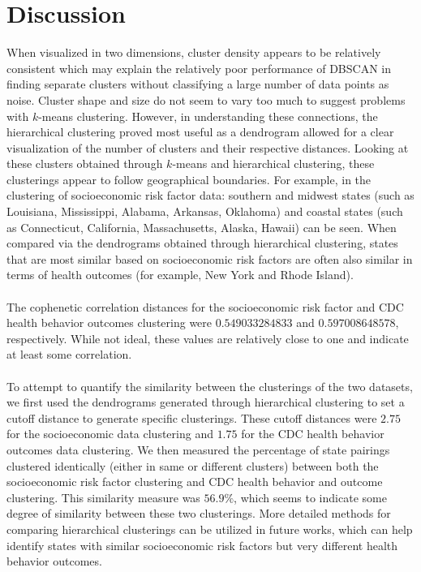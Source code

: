 \documentclass{article}
\begin{document}
\section{Discussion}
\label{Discussion}
When visualized in two dimensions, cluster density appears to be relatively consistent which may explain the relatively poor performance of DBSCAN in finding separate clusters without classifying a large number of data points as noise. Cluster shape and size do not seem to vary too much to suggest problems with $k$-means clustering. However, in understanding these connections, the hierarchical clustering proved most useful as a dendrogram allowed for a clear visualization of the number of clusters and their respective distances. Looking at these clusters obtained through $k$-means and hierarchical clustering, these clusterings appear to follow geographical boundaries. For example, in the clustering of socioeconomic risk factor data: southern and midwest states (such as Louisiana, Mississippi, Alabama, Arkansas, Oklahoma) and coastal states (such as Connecticut, California, Massachusetts, Alaska, Hawaii) can be seen. When compared via the dendrograms obtained through hierarchical clustering, states that are most similar based on socioeconomic risk factors are often also similar in terms of health outcomes (for example, New York and Rhode Island). 
\\\\
The cophenetic correlation distances for the socioeconomic risk factor and CDC health behavior outcomes clustering were $0.549033284833$ and $0.597008648578$, respectively. While not ideal, these values are relatively close to one and indicate at least some correlation.
\\\\
To attempt to quantify the similarity between the clusterings of the two datasets, we first used the dendrograms generated through hierarchical clustering to set a cutoff distance to generate specific clusterings. These cutoff distances were $2.75$ for the socioeconomic data clustering and $1.75$ for the CDC health behavior outcomes data clustering. We then measured the percentage of state pairings clustered identically (either in same or different clusters) between both the socioeconomic risk factor clustering and CDC health behavior and outcome clustering. This similarity measure was $56.9\%$, which seems to indicate some degree of similarity between these two clusterings. More detailed methods for comparing hierarchical clusterings can be utilized in future works, which can help identify states with similar socioeconomic risk factors but very different health behavior outcomes.
\end{document}
